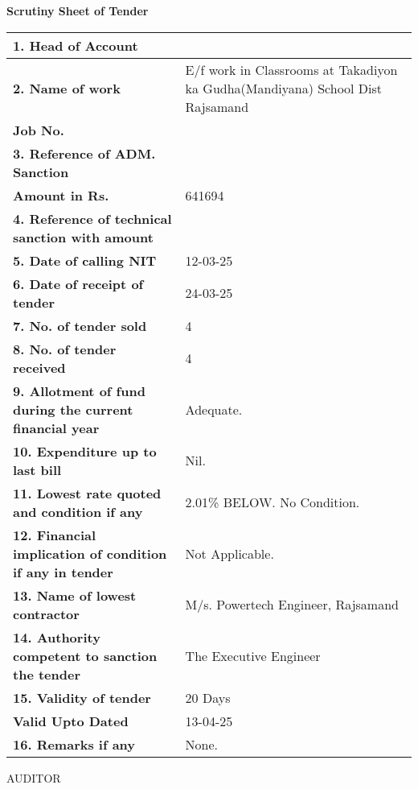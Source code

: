 \documentclass[a4paper]{article}
\begin{document}
\begin{center}
    \textbf{Scrutiny Sheet of Tender}
\end{center}

\begin{tabular}{|p{}|p{}|}
    \hline
    \textbf{1. Head of Account} & \\
    \hline
    \textbf{2. Name of work} & E/f work in Classrooms at Takadiyon ka Gudha(Mandiyana) School Dist Rajsamand \\
    \textbf{Job No.} & \\
    \hline
    \textbf{3. Reference of ADM. Sanction} & \\
    \textbf{Amount in Rs.} & 641694 \\
    \hline
    \textbf{4. Reference of technical sanction with amount} & \\
    \hline
    \textbf{5. Date of calling NIT} & 12-03-25 \\
    \hline
    \textbf{6. Date of receipt of tender} & 24-03-25 \\
    \hline
    \textbf{7. No. of tender sold} & 4 \\
    \hline
    \textbf{8. No. of tender received} & 4 \\
    \hline
    \textbf{9. Allotment of fund during the current financial year} & Adequate. \\
    \hline
    \textbf{10. Expenditure up to last bill} & Nil. \\
    \hline
    \textbf{11. Lowest rate quoted and condition if any} & 2.01\% BELOW. No Condition. \\
    \hline
    \textbf{12. Financial implication of condition if any in tender} & Not Applicable. \\
    \hline
    \textbf{13. Name of lowest contractor} & M/s. Powertech Engineer, Rajsamand \\
    \hline
    \textbf{14. Authority competent to sanction the tender} & The Executive Engineer \\
    \hline
    \textbf{15. Validity of tender} & 20 Days \\
    \textbf{Valid Upto Dated} & 13-04-25 \\
    \hline
    \textbf{16. Remarks if any} & None. \\
    \hline
\end{tabular}

\vspace{1cm}
\begin{flushleft}
    AUDITOR
\end{flushleft}
\end{document}
